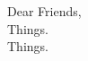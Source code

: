\documentclass[../../main.tex]{subfiles}
\begin{document}
Dear Friends,
\\
\vspace{0.15cm}
Things. \cite{haidt}
\\
\vspace{0.15cm}
Things.
\end{document}
